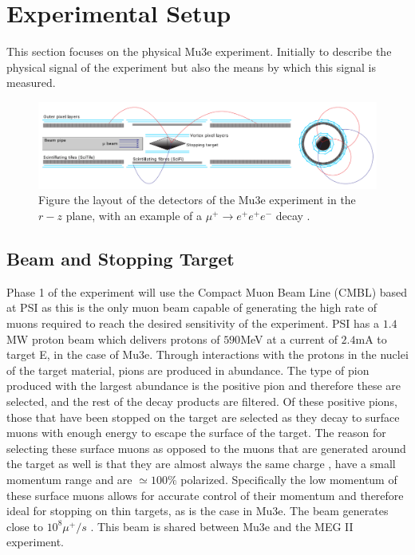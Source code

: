\section*{Experimental Setup}
This section focuses on the physical Mu3e experiment. Initially to describe the physical signal of the experiment but also the means by which this signal is measured.

\begin{figure}
    \centering
    \includegraphics[width=\textwidth]{fig/setup/det.PNG}
    \caption{Figure the layout of the detectors of the Mu3e experiment in the $r-z$ plane, with an example of a $\mu^{+}\xrightarrow{}e^{+}e^{+}e^{-}$ decay \cite{rudzki2021mu3e}.}
    \label{fig:det}
\end{figure}

\subsection*{Beam and Stopping Target}
Phase 1 of the experiment will use the Compact Muon Beam Line (CMBL) based at PSI as this is the only muon beam capable of generating the high rate of muons required to reach the desired sensitivity of the experiment. PSI has a $1.4$MW proton beam which delivers protons of $590$MeV at a current of $2.4$mA \cite{kiselev2021meson} to target E, in the case of Mu3e. Through interactions with the protons in the nuclei of the target material, pions are produced in abundance\cite{berg2016target}. The type of pion produced with the largest abundance is the positive pion and therefore these are selected, and the rest of the decay products are filtered. Of these positive pions, those that have been stopped on the target are selected as they decay to surface muons with enough energy to escape the surface of the target. The reason for selecting these surface muons as opposed to the muons that are generated around the target as well is that they are almost always the same charge \cite{berg2016target}, have a small momentum range and are $\simeq 100\%$ polarized\cite{kiselev2021meson}. Specifically the low momentum of these surface muons allows for accurate control of their momentum and therefore ideal for stopping on thin targets, as is the case in Mu3e. The beam generates close to $10^{8}\mu^{+}/s$ \cite{Calibbi}. This beam is shared between Mu3e and the MEG II experiment. 

